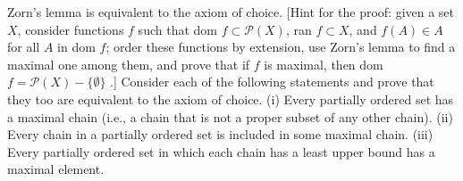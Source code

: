 \begin{named}[Exercise. ] Zorn's lemma is equivalent to the axiom of choice. [Hint for the proof: given a set $X$, consider functions $f$ such that dom $f \subset \mathcal{P}(X)$, ran $f \subset X$, and $f(A) \in A$ for all $A$ in dom $f$; order these functions by extension, use Zorn's lemma to find a maximal one among them, and prove that if $f$ is maximal, then dom $f = \mathcal{P}(X) - \{ \emptyset \}$ .] Consider each of the following statements and prove that they too are equivalent to the axiom of choice. (i) Every partially ordered set has a maximal chain (i.e., a chain that is not a proper subset of any other chain). (ii) Every chain in a partially ordered set is included in some maximal chain. (iii) Every partially ordered set in which each chain has a least upper bound has a maximal element.
\end{named}